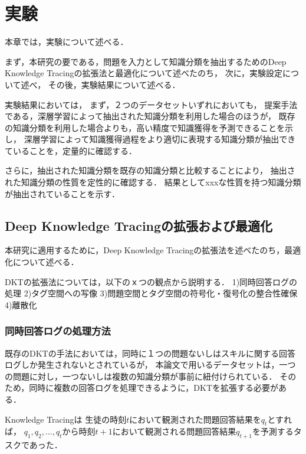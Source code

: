 \chapter{実験}
\label{chap:result}
\fancyhf{}
\rhead{\thepage}
\cfoot{\thepage}


本章では，実験について述べる．

まず，本研究の要である，問題を入力として知識分類を抽出するためのDeep Knowledge Tracingの拡張法と最適化について述べたのち，
次に，実験設定について述べ，
その後，実験結果について述べる．

実験結果においては，
まず，２つのデータセットいずれにおいても，
提案手法である，深層学習によって抽出された知識分類を利用した場合のほうが，
既存の知識分類を利用した場合よりも，高い精度で知識獲得を予測できることを示し，
深層学習によって知識獲得過程をより適切に表現する知識分類が抽出できていることを，定量的に確認する．

さらに，抽出された知識分類を既存の知識分類と比較することにより，
抽出された知識分類の性質を定性的に確認する．
結果としてxxxな性質を持つ知識分類が抽出されていることを示す．


\section{Deep Knowledge Tracingの拡張および最適化}
本研究に適用するために，Deep Knowledge Tracingの拡張法を述べたのち，最適化について述べる．

DKTの拡張法については，以下のｘつの観点から説明する．
1)同時回答ログの処理
2)タグ空間への写像
3)問題空間とタグ空間の符号化・復号化の整合性確保
4)離散化


\subsection{同時回答ログの処理方法}
既存のDKTの手法においては，同時に１つの問題ないしはスキルに関する回答ログしか発生されないとされているが，
本論文で用いるデータセットは，一つの問題に対し，一つないしは複数の知識分類が事前に紐付けられている．
そのため，同時に複数の回答ログを処理できるように，DKTを拡張する必要がある．

Knowledge Tracingは
生徒の時刻$t$において観測された問題回答結果を$q_{t}$とすれば，
$q_1, q_2, \dots, q_t$から時刻$t+1$において観測される問題回答結果$q_{t+1}$を予測するタスクであった．

